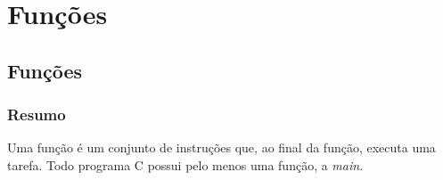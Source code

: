 
\part[Subalgoritmos]
{Funções}


\chapter[Subalgoritmos]
{Funções}



\section*{Resumo}

Uma função é um conjunto de instruções que, ao final da função, executa uma tarefa. Todo programa C possui pelo menos uma função, a \emph{main}.

%
%








